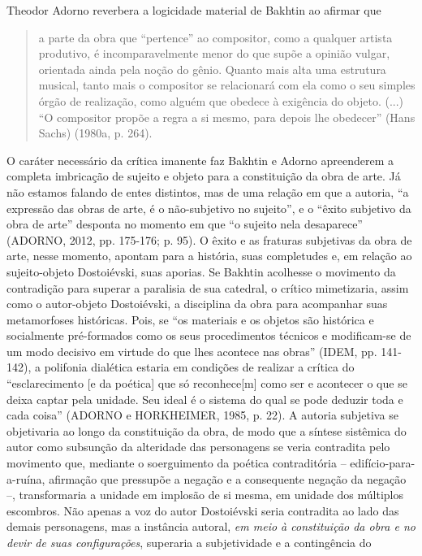 Theodor Adorno reverbera a logicidade material de Bakhtin ao afirmar que

\begin{quote}
a parte da obra que ``pertence'' ao compositor, como a qualquer artista
produtivo, é incomparavelmente menor do que supõe a opinião vulgar,
orientada ainda pela noção do gênio. Quanto mais alta uma estrutura
musical, tanto mais o compositor se relacionará com ela como o seu
simples órgão de realização, como alguém que obedece à exigência do
objeto. (...) ``O compositor propõe a regra a si mesmo, para depois lhe
obedecer'' (Hans Sachs) (1980a, p. 264).
\end{quote}

O caráter necessário da crítica imanente faz Bakhtin e Adorno
apreenderem a completa imbricação de sujeito e objeto para a
constituição da obra de arte. Já não estamos falando de entes distintos,
mas de uma relação em que a autoria, ``a expressão das obras de arte, é
o não-subjetivo no sujeito'', e o ``êxito subjetivo da obra de arte''
desponta no momento em que ``o sujeito nela desaparece'' (ADORNO, 2012,
pp. 175-176; p. 95). O êxito e as fraturas subjetivas da obra de arte,
nesse momento, apontam para a história, suas completudes e, em relação
ao sujeito-objeto Dostoiévski, suas aporias. Se Bakhtin acolhesse o
movimento da contradição para superar a paralisia de sua catedral, o
crítico mimetizaria, assim como o autor-objeto Dostoiévski, a disciplina
da obra para acompanhar suas metamorfoses históricas. Pois, se ``os
materiais e os objetos são histórica e socialmente pré-formados como os
seus procedimentos técnicos e modificam-se de um modo decisivo em
virtude do que lhes acontece nas obras'' (IDEM, pp. 141-142), a
polifonia dialética estaria em condições de realizar a crítica do
``esclarecimento {[}e da poética{]} que só reconhece{[}m{]} como ser e
acontecer o que se deixa captar pela unidade. Seu ideal é o sistema do
qual se pode deduzir toda e cada coisa'' (ADORNO e HORKHEIMER, 1985, p.
22). A autoria subjetiva se objetivaria ao longo da constituição da
obra, de modo que a síntese sistêmica do autor como subsunção da
alteridade das personagens se veria contradita pelo movimento que,
mediante o soerguimento da poética contraditória --
edifício-para-a-ruína, afirmação que pressupõe a negação e a consequente
negação da negação --, transformaria a unidade em implosão de si mesma,
em unidade dos múltiplos escombros. Não apenas a voz do autor
Dostoiévski seria contradita ao lado das demais personagens, mas a
instância autoral, \emph{em meio à constituição da obra e no devir de
suas configurações}, superaria a subjetividade e a contingência do

